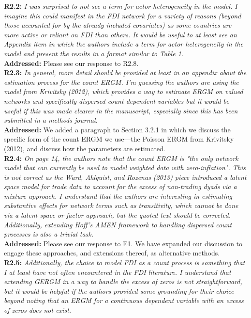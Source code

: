 \documentclass[a4paper,11pt]{texMemo}
\begin{document}
\noindent \textbf{R2.2:} \emph{I was surprised to not see a term for actor heterogeneity in the model. I imagine this could manifest in the FDI network for a variety of reasons (beyond those accounted for by the already included covariates) as some countries are more active or reliant on FDI than others. It would be useful to at least see an Appendix item in which the authors include a term for actor heterogeneity in the model and present the results in a format similar to Table 1.}\\

\noindent \textbf{Addressed:} Please see our response to R2.8. \\

\noindent \textbf{R2.3:} \emph{In general, more detail should be provided at least in an appendix about the estimation process for the count ERGM. I'm guessing the authors are using the model from Krivitsky (2012), which provides a way to estimate ERGM on valued networks and specifically dispersed count dependent variables but it would be useful if this was made clearer in the manuscript, especially since this has been submitted in a methods journal.}\\

\noindent \textbf{Addressed:} We added a paragraph to Section 3.2.1 in which we discuss the specific form of the count ERGM we use---the Poisson ERGM from Krivitsky (2012), and discuss how the parameters are estimated. \\

\noindent \textbf{R2.4:} \emph{On page 14, the authors note that the count ERGM is "the only network model that can currently be used to model weighted data with zero-inflation". This is not correct as the Ward, Ahlquist, and Rozenas (2013) piece introduced a latent space model for trade data to account for the excess of non-trading dyads via a mixture approach. I understand that the authors are interesting in estimating substantive effects for network terms such as transitivity, which cannot be done via a latent space or factor approach, but the quoted text should be corrected. Additionally, extending Hoff's AMEN framework to handling dispersed count processes is also a trivial task.}\\

\noindent \textbf{Addressed:} Please see our response to E1. We have expanded our discussion to engage these approaches, and extensions thereof, as alternative methods.\\

\noindent \textbf{R2.5:} \emph{Additionally, the choice to model FDI as a count process is something that I at least have not often encountered in the FDI literature. I understand that extending GERGM in a way to handle the excess of zeros is not straightforward, but it would be helpful if the authors provided some grounding for their choice beyond noting that an ERGM for a continuous dependent variable with an excess of zeros does not exist.}\\
\end{document}
